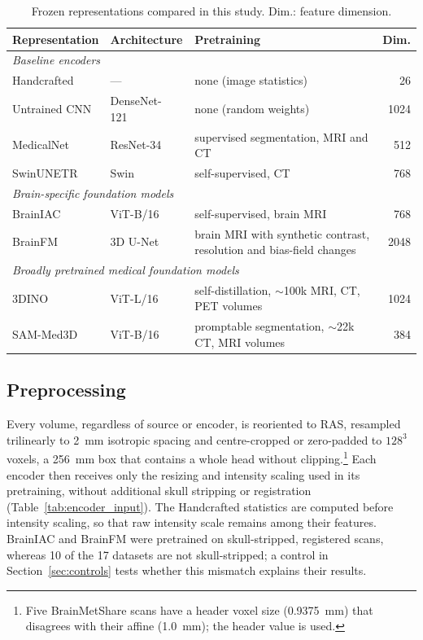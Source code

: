 \documentclass[11pt]{article}
\begin{document}
\begin{table}[t]
  \centering
  \small
  \caption{Frozen representations compared in this study. Dim.: feature
  dimension.}
  \label{tab:representations}
  \begin{tabular}{llp{5.6cm}r}
    \toprule
    Representation & Architecture & Pretraining & Dim. \\
    \midrule
    \multicolumn{4}{l}{\emph{Baseline encoders}} \\
    Handcrafted & --- & none (image statistics) & 26 \\
    Untrained CNN & DenseNet-121~\cite{huang_densely_2017} & none (random weights) & 1024 \\
    MedicalNet~\cite{chen_med3d_2019} & ResNet-34~\cite{he_deep_2016} & supervised segmentation, MRI and CT & 512 \\
    SwinUNETR~\cite{hatamizadeh_swin_2022-1} & Swin & self-supervised, CT~\cite{tang_self-supervised_2022} & 768 \\
    \midrule
    \multicolumn{4}{l}{\emph{Brain-specific foundation models}} \\
    BrainIAC~\cite{tak_generalizable_2026} & ViT-B/16 & self-supervised, brain MRI & 768 \\
    BrainFM~\cite{liu_modality-agnostic_2025} & 3D U-Net & brain MRI with synthetic contrast, resolution and bias-field changes & 2048 \\
    \midrule
    \multicolumn{4}{l}{\emph{Broadly pretrained medical foundation models}} \\
    3DINO~\cite{xu_generalizable_2025} & ViT-L/16 & self-distillation, ${\sim}$100k MRI, CT, PET volumes & 1024 \\
    SAM-Med3D~\cite{wang_sam-med3d_2025} & ViT-B/16 & promptable segmentation, ${\sim}$22k CT, MRI volumes & 384 \\
    \bottomrule
  \end{tabular}
\end{table}

\subsection{Preprocessing}

Every volume, regardless of source or encoder, is reoriented to RAS,
resampled trilinearly to 2~mm isotropic spacing and centre-cropped or
zero-padded to $128^{3}$ voxels, a 256~mm box that contains a whole head
without clipping.\footnote{Five BrainMetShare scans have a header voxel size
(0.9375~mm) that disagrees with their affine (1.0~mm); the header value is
used.} Each encoder then receives only the resizing and intensity scaling
used in its pretraining, without additional skull stripping or registration
(Table~\ref{tab:encoder_input}). The Handcrafted statistics are computed
before intensity scaling, so that raw intensity scale remains among their
features. BrainIAC and BrainFM were pretrained on skull-stripped, registered
scans, whereas 10 of the 17 datasets are not skull-stripped; a control in
Section~\ref{sec:controls} tests whether this mismatch explains their
results.
\end{document}

